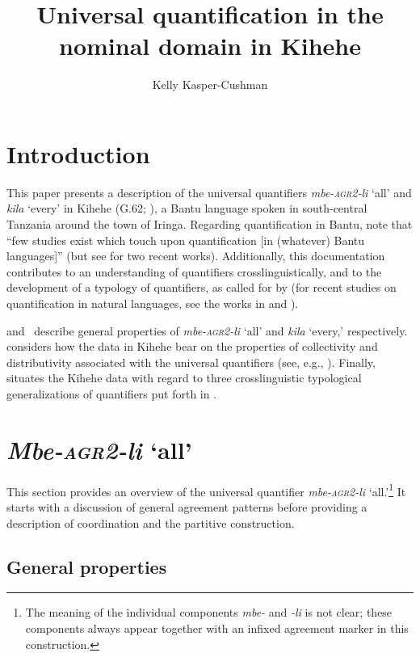 \documentclass[output=paper,modfonts,nonflat]{langsci/langscibook}
\title{Universal quantification in the nominal domain in Kihehe}
\author{Kelly Kasper-Cushman\affiliation{Indiana University}}
\begin{document}
\maketitle

\section{Introduction}

This paper presents a description of the universal quantifiers \textit{mbe-\textsc{agr2}-li} `all' and \textit{kila} `every' in Kihehe (G.62; \citealt{maho09}), a Bantu language spoken in south-central Tanzania around the town of Iringa.
Regarding quantification in Bantu, \cite[383]{zerbian08} note that ``few studies exist which touch upon quantification [in (whatever) Bantu languages]'' (but see \citealt{Landman2016, Landmantoappear} for two recent works). Additionally, this documentation contributes to an understanding of quantifiers crosslinguistically, and to the development of a typology of quantifiers, as called for by \cite{Matthewson2013} (for recent studies on quantification in natural languages, see the works in \citealt{gil13, keenan12, matthewson08} and \citealt{paperno17}).

 and~ describe general properties of \textit{mbe-\textsc{agr2}-li} `all' and \textit{kila} `every,' respectively.  considers how the data in Kihehe bear on the properties of collectivity and distributivity associated with the universal quantifiers (see, e.g., \citealt{szabolcsi10}). Finally,  situates the Kihehe data with regard to three crosslinguistic typological generalizations of quantifiers put forth in \citet{Matthewson2013}. 


\section{\emph{Mbe-\textsc{agr2}-li} `all'}\label{sec:kasper:2}

This section provides an overview of the universal quantifier \emph{mbe-\textsc{agr2}-li} `all.'\footnote{The meaning of the individual components \textit{mbe-} and \textit{-li} is not clear; these components always appear together with an infixed agreement marker in this construction.} It starts with a discussion of general agreement patterns before providing a description of coordination and the partitive construction. 

\subsection{General properties}
\end{document}
